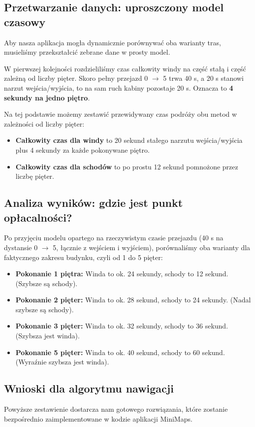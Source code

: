 \documentclass[14pt,a4paper]{extarticle}
\begin{document}
\subsection{Przetwarzanie danych: uproszczony model czasowy}
Aby nasza aplikacja mogła dynamicznie porównywać oba warianty tras, musieliśmy przekształcić zebrane dane w prosty model.

W pierwszej kolejności rozdzieliliśmy czas całkowity windy na część stałą i część zależną od liczby pięter. Skoro pełny przejazd 0 $\rightarrow$ 5 trwa 40 s, a 20 s stanowi narzut wejścia/wyjścia, to na sam ruch kabiny pozostaje 20 s. Oznacza to \textbf{4 sekundy na jedno piętro}.

Na tej podstawie możemy zestawić przewidywany czas podróży obu metod w zależności od liczby pięter:
\begin{itemize}
    \item \textbf{Całkowity czas dla windy} to 20 sekund stałego narzutu wejścia/wyjścia plus 4 sekundy za każde pokonywane piętro.
    \item \textbf{Całkowity czas dla schodów} to po prostu 12 sekund pomnożone przez liczbę pięter.
\end{itemize}

\subsection{Analiza wyników: gdzie jest punkt opłacalności?}
Po przyjęciu modelu opartego na rzeczywistym czasie przejazdu (40 s na dystansie 0 $\rightarrow$ 5, łącznie z wejściem i wyjściem), porównaliśmy oba warianty dla faktycznego zakresu budynku, czyli od 1 do 5 pięter:

\begin{itemize}
    \item \textbf{Pokonanie 1 piętra:} Winda to ok. 24 sekundy, schody to 12 sekund. (Szybsze są schody).
    \item \textbf{Pokonanie 2 pięter:} Winda to ok. 28 sekund, schody to 24 sekundy. (Nadal szybsze są schody).
    \item \textbf{Pokonanie 3 pięter:} Winda to ok. 32 sekundy, schody to 36 sekund. (Szybsza jest winda).
    \item \textbf{Pokonanie 5 pięter:} Winda to ok. 40 sekund, schody to 60 sekund. (Wyraźnie szybsza jest winda).
\end{itemize}

\subsection{Wnioski dla algorytmu nawigacji}
Powyższe zestawienie dostarcza nam gotowego rozwiązania, które zostanie bezpośrednio zaimplementowane w kodzie aplikacji MiniMaps.
\end{document}
